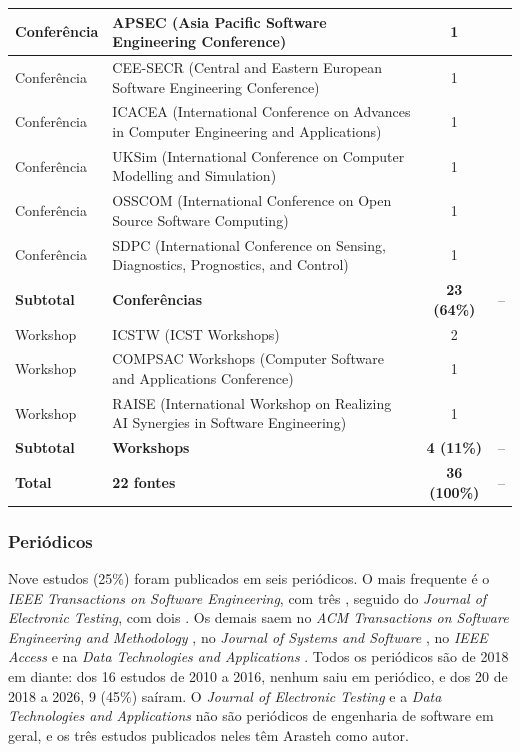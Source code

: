 \begin{table}[H]
\begin{tabular}{|p{2.3cm}|p{5.5cm}|c|p{4.7cm}|}
        \hline
        Conferência & APSEC (Asia Pacific Software Engineering Conference) & 1 & \cite{kintis2010} \\
        \hline
        Conferência & CEE-SECR (Central and Eastern European Software Engineering Conference) & 1 & \cite{dimov2010} \\
        \hline
        Conferência & ICACEA (International Conference on Advances in Computer Engineering and Applications) & 1 & \cite{chauhan2015} \\
        \hline
        Conferência & UKSim (International Conference on Computer Modelling and Simulation) & 1 & \cite{assylbekov2013} \\
        \hline
        Conferência & OSSCOM (International Conference on Open Source Software Computing) & 1 & \cite{alenezi2016} \\
        \hline
        Conferência & SDPC (International Conference on Sensing, Diagnostics, Prognostics, and Control) & 1 & \cite{he2024} \\
        \hline
        \textbf{Subtotal} & \textbf{Conferências} & \textbf{23 (64\%)} & -- \\
        \hline
        Workshop & ICSTW (ICST Workshops) & 2 & \cite{esterobotaro2010, ashong2026} \\
        \hline
        Workshop & COMPSAC Workshops (Computer Software and Applications Conference) & 1 & \cite{belli2011} \\
        \hline
        Workshop & RAISE (International Workshop on Realizing AI Synergies in Software Engineering) & 1 & \cite{jalbert2012} \\
        \hline
        \textbf{Subtotal} & \textbf{Workshops} & \textbf{4 (11\%)} & -- \\
        \hline
        \textbf{Total} & \textbf{22 fontes} & \textbf{36 (100\%)} & -- \\
        \hline
    \end{tabular}
\end{table}

\subsubsection{Periódicos}
\label{subsubsec:periodicos}

Nove estudos (25\%) foram publicados em seis periódicos. O mais frequente é o \textit{IEEE Transactions on Software Engineering}, com três \cite{zhang2019, zhang2022, guizzo2022}, seguido do \textit{Journal of Electronic Testing}, com dois \cite{arasteh2022, arasteh2023}. Os demais saem no \textit{ACM Transactions on Software Engineering and Methodology} \cite{khanfir2023}, no \textit{Journal of Systems and Software} \cite{tao2025}, no \textit{IEEE Access} \cite{lin2018} e na \textit{Data Technologies and Applications} \cite{shomali2020}. Todos os periódicos são de 2018 em diante: dos 16 estudos de 2010 a 2016, nenhum saiu em periódico, e dos 20 de 2018 a 2026, 9 (45\%) saíram. O \textit{Journal of Electronic Testing} e a \textit{Data Technologies and Applications} não são periódicos de engenharia de software em geral, e os três estudos publicados neles têm Arasteh como autor.

